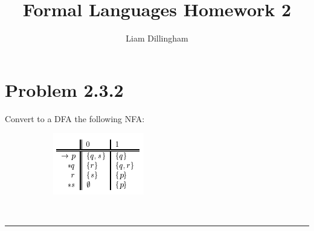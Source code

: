 \documentclass[20pt]{article} %
\title{Formal Languages Homework 2}
\author{Liam Dillingham}
\begin{document}
\maketitle

\section{Problem 2.3.2}
Convert to a DFA the following NFA: 
\begin{figure}[!htbp]
  	\centering
   	\begin{subfigure}[p]{0.3\linewidth}
    	\includegraphics[width=\linewidth]{./figures/HW2fig1.png}
   	\end{subfigure}
\end{figure} \\
\noindent\rule{2cm}{0.4pt} \\
\end{document}
